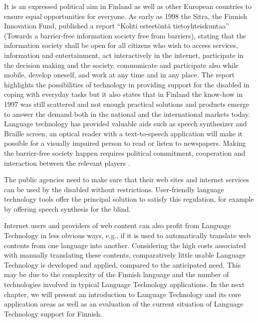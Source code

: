 \documentclass[]{../../metanetpaper}
\begin{document}
\begin{multicols}{2}
It is an expressed political aim in Finland as well as other European
countries to ensure equal opportunities for everyone. As early as 1998
the Sitra, the Finnish Innovation Fund, published a report “Kohti
esteetöntä tietoyhteiskuntaa” (Towards a barrier-free information
society free from barriers), stating that the information society
shall be open for all citizens who wish to access services, information
and entertainment, act interactively in the internet,
participate in the decision making and the society, communicate and
participate also while mobile, develop oneself, and work at any time
and in any place. The report highlights the possibilities of technology in
providing support for the disabled in coping with everyday tasks but
it also states that in Finland the know-how in 1997 was still
scattered and not enough practical solutions and products emerge to
answer the demand both in the national and the international
markets today. Language technology has provided valuable aids such as speech
synthesizer and Braille screen, an optical reader with a
text-to-speech application will make it possible for a visually
impaired person to read or listen to newspapers. Making the
barrier-free society happen requires political commitment, cooperation
and interaction between the relevant players \cite{Sitra1998}.

The public agencies need to make sure that their web sites and internet
services can be used by the disabled without restrictions. User-friendly
language technology tools offer the principal solution to satisfy this
regulation, for example by offering speech synthesis for the blind.

Internet users and providers of web content can also profit from
Language Technology in less obvious ways, e.g., if it is used to
automatically translate web contents from one language into
another. Considering the high costs associated with manually
translating these contents, comparatively little usable Language
Technology is developed and applied, compared to the anticipated
need. This may be due to the complexity of the Finnish language and
the number of technologies involved in typical Language Technology
applications. In the next chapter, we will present an introduction to
Language Technology and its core application areas as well as an
evaluation of the current situation of Language Technology support for
Finnish.

\end{multicols}
\clearpage
{}
\end{document}
